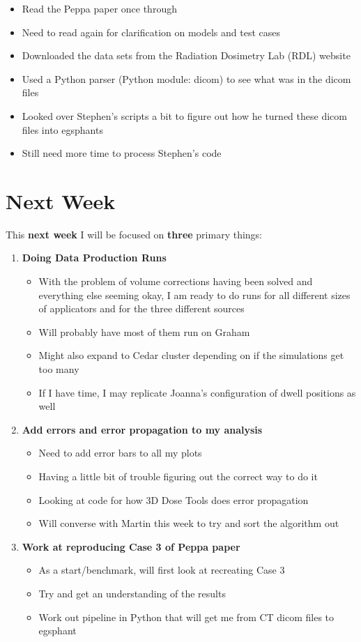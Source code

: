 \documentclass[12pt]{article}
\begin{document}
\begin{enumerate}
\begin{itemize}
		\item Read the Peppa paper once through
		\item Need to read again for clarification on models and test cases
		\item Downloaded the data sets from the Radiation Dosimetry Lab (RDL) website
		\item Used a Python parser (Python module: dicom) to see what was in the dicom files
		\item Looked over Stephen's scripts a bit to figure out how he turned these dicom files into egsphants
		\item Still need more time to process Stephen's code
	\end{itemize}
\end{enumerate}

\section{Next Week}

This \textbf{next week} I will be focused on \textbf{three} primary things:
\begin{enumerate}
	\item \textbf{Doing Data Production Runs}
	\begin{itemize}
		\item With the problem of volume corrections having been solved and everything else seeming okay, I am ready to do runs for all different sizes of applicators and for the three different sources
		\item Will probably have most of them run on Graham
		\item Might also expand to Cedar cluster depending on if the simulations get too many
		\item If I have time, I may replicate Joanna's configuration of dwell positions as well
	\end{itemize}
	\item \textbf{Add errors and error propagation to my analysis}
	\begin{itemize}
		\item Need to add error bars to all my plots
		\item Having a little bit of trouble figuring out the correct way to do it
		\item Looking at code for how 3D Dose Tools does error propagation
		\item Will converse with Martin this week to try and sort the algorithm out
	\end{itemize}
	\item \textbf{Work at reproducing Case 3 of Peppa paper}
	\begin{itemize}
		\item As a start/benchmark, will first look at recreating Case 3
		\item Try and get an understanding of the results 
		\item Work out pipeline in Python that will get me from CT dicom files to egsphant
	\end{itemize}
\end{enumerate}
\end{document}
